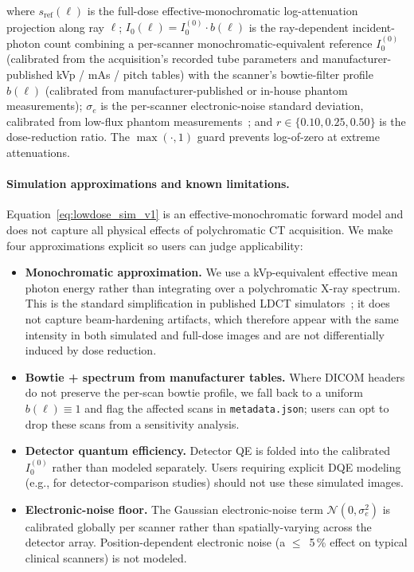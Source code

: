 \documentclass[twoside,11pt]{article}
\begin{document}
where $s_{\textrm{ref}}(\ell)$ is the full-dose effective-monochromatic log-attenuation projection along ray $\ell$; $I_0(\ell) = I_0^{(0)} \cdot b(\ell)$ is the ray-dependent incident-photon count combining a per-scanner monochromatic-equivalent reference $I_0^{(0)}$ (calibrated from the acquisition's recorded tube parameters and manufacturer-published kVp / mAs / pitch tables) with the scanner's bowtie-filter profile $b(\ell)$ (calibrated from manufacturer-published or in-house phantom measurements); $\sigma_e$ is the per-scanner electronic-noise standard deviation, calibrated from low-flux phantom measurements~\citep{zeng2015nonlocal}; and $r \in \{0.10, 0.25, 0.50\}$ is the dose-reduction ratio. The $\max(\cdot,1)$ guard prevents log-of-zero at extreme attenuations.

\paragraph{Simulation approximations and known limitations.} Equation~\eqref{eq:lowdose_sim_v1} is an effective-monochromatic forward model and does not capture all physical effects of polychromatic CT acquisition. We make four approximations explicit so users can judge applicability:

\begin{itemize}
    \item \textbf{Monochromatic approximation.} We use a kVp-equivalent effective mean photon energy rather than integrating over a polychromatic X-ray spectrum. This is the standard simplification in published LDCT simulators~\citep{zeng2015nonlocal,wang2020deeplearningreview}; it does not capture beam-hardening artifacts, which therefore appear with the same intensity in both simulated and full-dose images and are not differentially induced by dose reduction.
    \item \textbf{Bowtie + spectrum from manufacturer tables.} Where DICOM headers do not preserve the per-scan bowtie profile, we fall back to a uniform $b(\ell) \equiv 1$ and flag the affected scans in \texttt{metadata.json}; users can opt to drop these scans from a sensitivity analysis.
    \item \textbf{Detector quantum efficiency.} Detector QE is folded into the calibrated $I_0^{(0)}$ rather than modeled separately. Users requiring explicit DQE modeling (e.g., for detector-comparison studies) should not use these simulated images.
    \item \textbf{Electronic-noise floor.} The Gaussian electronic-noise term $\mathcal{N}(0,\sigma_e^2)$ is calibrated globally per scanner rather than spatially-varying across the detector array. Position-dependent electronic noise (a $\leq$~5\,\% effect on typical clinical scanners) is not modeled.
\end{itemize}
\end{document}
